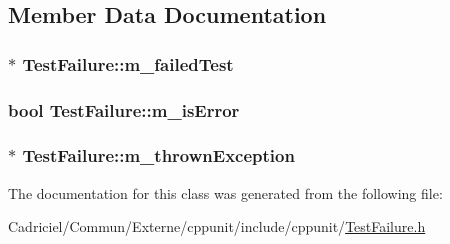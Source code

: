 \subsection{Member Data Documentation}
\hypertarget{class_test_failure_a2ba79089909967b45aedc4992b51553a}{
\subsubsection[{m\-\_\-failed\-Test}]{$\ast$ Test\-Failure\-::m\-\_\-failed\-Test\hspace{0.3cm}{\ttfamily [protected]}}}\label{class_test_failure_a2ba79089909967b45aedc4992b51553a}
\hypertarget{class_test_failure_abf258e5bec289b51fb13147a62b8b75d}{
\subsubsection[{m\-\_\-is\-Error}]{\setlength{\rightskip}{0pt plus 5cm}bool Test\-Failure\-::m\-\_\-is\-Error\hspace{0.3cm}{\ttfamily [protected]}}}\label{class_test_failure_abf258e5bec289b51fb13147a62b8b75d}
\hypertarget{class_test_failure_a96bfae3c1f32d0c1729501d68016f431}{
\subsubsection[{m\-\_\-thrown\-Exception}]{$\ast$ Test\-Failure\-::m\-\_\-thrown\-Exception\hspace{0.3cm}{\ttfamily [protected]}}}\label{class_test_failure_a96bfae3c1f32d0c1729501d68016f431}


The documentation for this class was generated from the following file\-:\begin{DoxyCompactItemize}
\item 
Cadriciel/\-Commun/\-Externe/cppunit/include/cppunit/\hyperlink{_test_failure_8h}{Test\-Failure.\-h}\end{DoxyCompactItemize}
